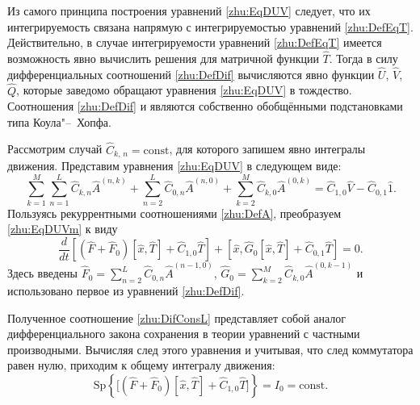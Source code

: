         Из самого принципа построения уравнений \eqref{zhu:EqDUV}
        следует, что их интегрируемость связана напрямую с
        интегрируемостью уравнений \eqref{zhu:DefEqT}. Действительно,
        в случае интегрируемости уравнений \eqref{zhu:DefEqT} имеется
        возможность явно вычислить решения для матричной функции
        $\hat{T}$. Тогда в силу дифференциальных соотношений \eqref{zhu:DefDif}
        вычисляются явно функции $\hat{U}$, $\hat{V}$, $\hat{Q}$, которые заведомо
        обращают уравнения \eqref{zhu:EqDUV} в тождество. Соотношения
        \eqref{zhu:DefDif} и являются собственно обобщёнными подстановками типа
        Коула"--~Хопфа.
        
\smallskip        

         Рассмотрим случай $\hat{C}_{k,\,n}=\text{const}$, для которого запишем
        явно интегралы движения.
        Представим уравнения   \eqref{zhu:EqDUV}  в следующем виде:
        \begin{equation}
        \label{zhu:EqDUVm}
           \sum\limits_{k=1}^M \sum\limits_{n=1}^L
            \hat{C}_{k,n}\hat{A}^{(n,k)}+\sum\limits_{n=2}^L
            \hat{C}_{0,n}\hat{A}^{(n,0)}+\sum\limits_{k=2}^M
            \hat{C}_{k,0}\hat{A}^{(0,k)}=\hat{C}_{1,0}\hat{V} - \hat{C}_{0,1}\hat{1}.
        \end{equation}
        Пользуясь рекуррентными соотношениями \eqref{zhu:DefA},
        преобразуем \eqref{zhu:EqDUVm}  к виду
        \begin{equation}
        \label{zhu:DifConsL}
            \frac{d}{dt}\left[(\hat{F}+\hat{F}_0)[\hat{x},\hat{T}]+\hat{C}_{1,0}\hat{T} \right]+\left[\hat{x},\hat{G}_0[\hat{x},\hat{T}]+\hat{C}_{0,1}\hat{T}\right]=0.
        \end{equation}
        Здесь введены 
        $
            \hat{F}_0 =\sum_{n=2}^L
            \hat{C}_{0,n}\hat{A}^{(n-1,0)}$, $\hat{G}_0=\sum_{k=2}^M \hat{C}_{k,0}\hat{A}^{(0,k-1)}
        $
        и использовано первое из уравнений \eqref{zhu:DefDif}.

        Полученное соотношение \eqref{zhu:DifConsL} представляет собой аналог
        дифференциального закона сохранения в теории уравнений с
        частными производными. Вычисляя след этого уравнения и
        учитывая, что след коммутатора равен нулю, приходим к
        общему  интегралу движения: 
        \begin{equation*}
            \text{Sp} \left\{\Big[(\hat{F}+\hat{F}_0)[\hat{x},\hat{T}]+\hat{C}_{1,0}\hat{T}\Big]\right\}=I_0= \text{const}.
        \end{equation*}

